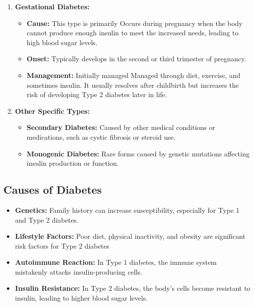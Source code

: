 \documentclass[12pt,a4paper]{article}
\begin{document}
\begin{enumerate}
    \item \textbf{Gestational Diabetes:}
      \begin{itemize}
        \item \textbf{Cause:} This type is primarily Occurs during pregnancy when the body cannot produce enough insulin to meet the increased needs, leading to high blood sugar levels.

        \item \textbf{Onset:} Typically develops in the second or third trimester of pregnancy.

        \item \textbf{Management:} Initially managed Managed through diet, exercise, and sometimes insulin. It usually resolves after childbirth but increases the risk of developing Type 2 diabetes later in life.
        
    \end{itemize}

    \item \textbf{Other Specific Types:}
  \begin{itemize}
 
        \item \textbf{Secondary Diabetes:} Caused by other medical conditions or medications, such as cystic fibrosis or steroid use.

       \item \textbf{Monogenic Diabetes: }Rare forms caused by genetic mutations affecting insulin production or function.
        
    \end{itemize}
    
\end{enumerate}

\subsection*{Causes of Diabetes}
\begin{itemize}
    \item \textbf{Genetics: }Family history can increase susceptibility, especially for Type 1 and Type 2 diabetes.
    \item \textbf{Lifestyle Factors: }Poor diet, physical inactivity, and obesity are significant risk factors for Type 2 diabetes
    \item \textbf{Autoimmune Reaction: }In Type 1 diabetes, the immune system mistakenly attacks insulin-producing cells.
    \item \textbf{Insulin Resistance: }In Type 2 diabetes, the body's cells become resistant to insulin, leading to higher blood sugar levels.
\end{itemize}
\end{document}
